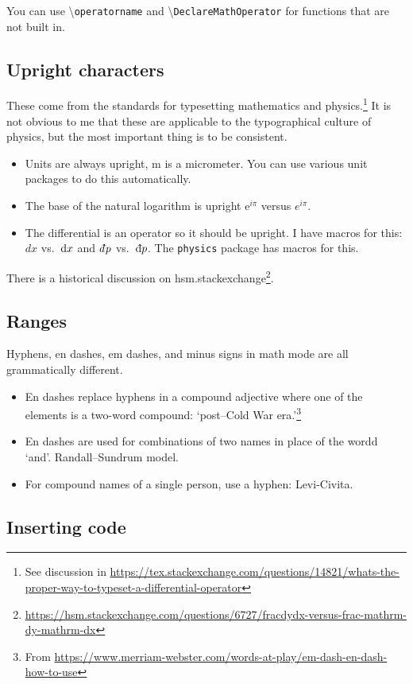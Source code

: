 You can use \textbackslash\texttt{operatorname} and \textbackslash\texttt{DeclareMathOperator} for functions that are not built in.

\subsection{Upright characters}
These come from the  standards for typesetting mathematics and physics.\footnote{See discussion in \url{https://tex.stackexchange.com/questions/14821/whats-the-proper-way-to-typeset-a-differential-operator}} It is not obvious to me that these are applicable to the typographical culture of physics, but the most important thing is to be consistent.
\begin{itemize}
	\item Units are always upright, \textmu m is a micrometer. You can use various unit packages to do this automatically. 
	\item The base of the natural logarithm is upright $\mathrm{e}^{i\pi}$ versus $e^{i\pi}$.
	\item The differential is an operator so it should be upright. I have macros for this: $dx$ vs.~$\operatorname{d}\!{x}$ and $\dbar p$ vs.~$\Dbar{p}$. The \texttt{physics} package has macros for this. 
\end{itemize}
There is a historical discussion on hsm.stackexchange\footnote{\url{https://hsm.stackexchange.com/questions/6727/fracdydx-versus-frac-mathrm-dy-mathrm-dx}}.


\subsection{Ranges}

Hyphens, en dashes, em dashes, and minus signs in math mode are all grammatically different.
\begin{itemize}
	\item En dashes replace hyphens in a compound adjective where one of the elements is a two-word compound: `post--Cold War era.'\footnote{From \url{https://www.merriam-webster.com/words-at-play/em-dash-en-dash-how-to-use}}
	\item En dashes are used for combinations of two names in place of the wordd `and'. Randall--Sundrum model.
	\item For compound names of a single person, use a hyphen: Levi-Civita.
\end{itemize}

\subsection{Inserting code}

